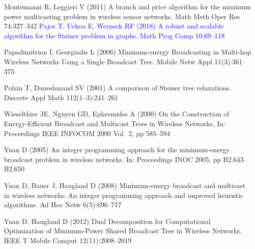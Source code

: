 \documentclass[natbib,smallextended]{svjour3}       %
\begin{document}
\begin{thebibliography}{}
Montemanni R, Leggieri V (2011)
A branch and price algorithm for the minimum power multicasting problem in wireless sensor networks.
Math Meth Oper Res
74:327--342
\textcolor{blue}{
Pajor T, Uchoa E, Werneck RF (2018)
A robust and scalable algorithm for the Steiner problem in graphs.
Math Prog Comp 10:69--118
}

Papadimitriou I, Georgiadis L (2006)
Minimum-energy Broadcasting in Multi-hop Wireless Networks Using a Single Broadcast Tree.
Mobile Netw Appl
11(3):361--375

Polzin T, Daneshmand SV (2001)
A comparison of Steiner tree relaxations.
Discrete Appl Math
112(1--3):241--261

Wieselthier JE, Nguyen GD, Ephremides A (2000)
On the Construction of Energy-Efficient Broadcast and Multicast Trees in Wireless Networks,
In: Proceedings IEEE INFOCOM 2000 Vol.\ 2, pp 585--594

Yuan D (2005)
An integer programming approach for the minimum-energy broadcast problem in wireless networks.
In: Proceedings INOC 2005, pp B2.643–B2.650

Yuan D, Bauer J, Haugland D (2008)
Minimum-energy broadcast and multicast in wireless networks: An
integer programming approach and improved heuristic algorithms.
Ad Hoc Netw
6(5):696–717

Yuan D, Haugland D (2012)
Dual Decomposition for Computational Optimization of Minimum-Power Shared Broadcast Tree in Wireless Networks.
IEEE T Mobile Comput
12(11):2008--2019

\end{thebibliography}
\end{document}
